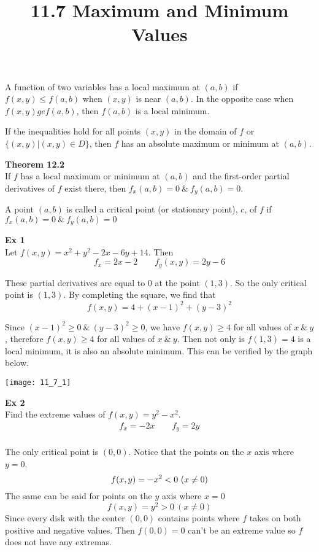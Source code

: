 \documentclass{article}
\title{11.7 Maximum and Minimum Values}
\begin{document}
    \maketitle
    A function of two variables has a local maximum at $ (a,b) $ if $ f(x,y) \le f(a,b) $ when $ (x,y) $ is near $ (a,b) $. In the opposite case when $ f(x,y) ge f(a,b) $, then $ f(a,b) $ is a local minimum.

    If the inequalities hold for all points $ (x,y) $ in the domain of $ f $ or $ \{ (x,y)|(x,y) \in D \} $, then $ f $ has an absolute maximum or minimum at $ (a,b) $.

    \textbf{Theorem 12.2}\\
    If $ f $ has a local maximum or minimum at $ (a,b) $ and the first-order partial derivatives of $ f $ exist there, then $ f_{x}(a,b)=0 ~\&~ f_{y}(a,b) =0$.

    A point $ (a,b) $ is called a critical point (or stationary point), $ c $, of $ f $ if $ f_x(a,b)=0 ~\&~ f_y(a,b)=0 $ 

    \textbf{Ex 1}\\
    Let $ f(x,y) =x^{2}+y^{2}-2x-6y+14 $. Then
    \[
        f_{x}=2x-2 \qquad f_{y}(x,y)=2y-6  
    \]

    These partial derivatives are equal to $ 0 $ at the point $ (1,3) $. So the only critical point is $ (1,3) $. By completing the square, we find that
    \[
        f(x,y)=4+(x-1)^{2}+(y-3)^{2}  
    \]

    Since $ (x-1)^{2} \ge 0 ~\&~ (y-3)^{2} \ge 0 $, we have $ f(x,y) \ge 4 $ for all values of $ x ~\&~ y $, therefore $ f(x,y) \ge 4$ for all values of $ x ~\&~ y $. Then not only is $ f(1,3)=4 $ is a local minimum, it is also an absolute minimum. This can be verified by the graph below.
    \begin{center}
        \texttt{[image: 11\_7\_1]}
    \end{center}
    
    \textbf{Ex 2}\\
    Find the extreme values of $ f(x,y)=y^{2}-x^{2}. $
    \[
        \begin{gathered}
        f_{x}=-2x \qquad f_{y}=2y\\
        \end{gathered}
    \]
    
    The only critical point is $ (0,0) $. Notice that the points on the $ x $  axis where $ y=0 $. 
    \[
        f(x,y)=-x^{2}<0~(x\neq 0)\\ 
    \]
    The same can be said for points on the $ y $ axis where $ x=0 $
    \[
        f(x,y)=y^{2}>0~(x\neq 0) 
    \]
    Since every disk with the center $ (0,0) $ contains points where $ f $ takes on both positive and negative values. Then $ f(0,0)=0 $ can't be an extreme value so $ f $ does not have any extremas.
   
\end{document}
